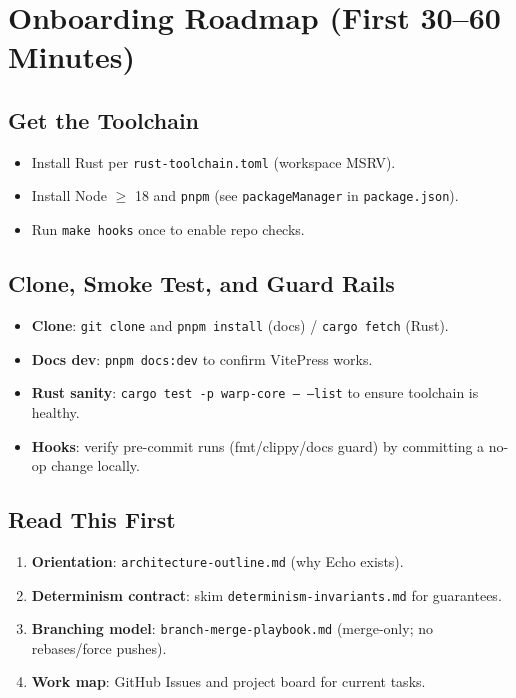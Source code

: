 
\chapter{Onboarding Roadmap (First 30–60 Minutes)}

\section{Get the Toolchain}
\begin{itemize}
    \item Install Rust per \texttt{rust-toolchain.toml} (workspace MSRV).
    \item Install Node $\geq$ 18 and \texttt{pnpm} (see \texttt{packageManager} in \texttt{package.json}).
    \item Run \texttt{make hooks} once to enable repo checks.
\end{itemize}

\section{Clone, Smoke Test, and Guard Rails}
\begin{itemize}
    \item \textbf{Clone}: \texttt{git clone} and \texttt{pnpm install} (docs) / \texttt{cargo fetch} (Rust).
    \item \textbf{Docs dev}: \texttt{pnpm docs:dev} to confirm VitePress works.
    \item \textbf{Rust sanity}: \texttt{cargo test -p warp-core -- --list} to ensure toolchain is healthy.
    \item \textbf{Hooks}: verify pre-commit runs (fmt/clippy/docs guard) by committing a no-op change locally.
\end{itemize}

\section{Read This First}
\begin{enumerate}
    \item \textbf{Orientation}: \texttt{architecture-outline.md} (why Echo exists).
    \item \textbf{Determinism contract}: skim \texttt{determinism-invariants.md} for guarantees.
    \item \textbf{Branching model}: \texttt{branch-merge-playbook.md} (merge-only; no rebases/force pushes).
    \item \textbf{Work map}: GitHub Issues and project board for current tasks.
\end{enumerate}

